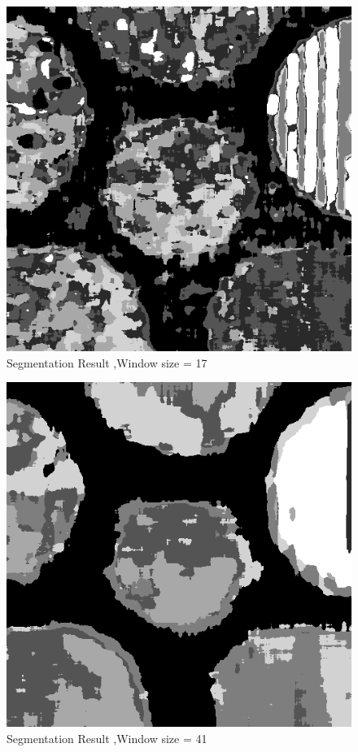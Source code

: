 \documentclass[11pt]{article}
\begin{document}
\begin{figure}[!htp]
	\centering
	\includegraphics[scale=0.4]{texture_seg_17.png}
	\caption{Segmentation Result ,Window size = 17}
	\label{texture_seg_17}
	\end{figure}
	
\begin{figure}[!htp]
	\centering
	\includegraphics[scale=0.4]{texture_seg_41.png}
	\caption{Segmentation Result ,Window size = 41}
	\label{texture_seg_41}
	\end{figure}
\end{document}
